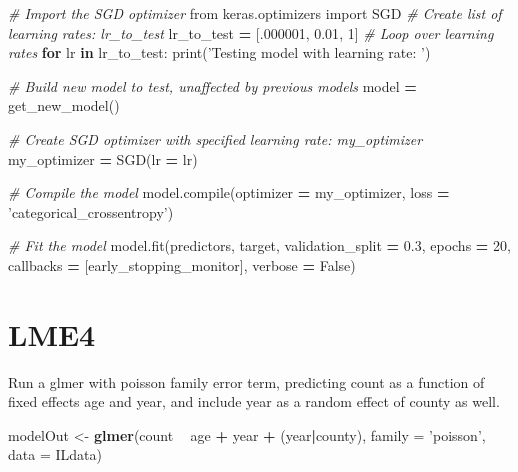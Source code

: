 \documentclass[]{book}
\newenvironment{Shaded}{\begin{snugshade}}{\end{snugshade}}
\newcommand{\KeywordTok}[1]{\textcolor[rgb]{0.13,0.29,0.53}{\textbf{#1}}}
\newcommand{\DataTypeTok}[1]{\textcolor[rgb]{0.13,0.29,0.53}{#1}}
\newcommand{\DecValTok}[1]{\textcolor[rgb]{0.00,0.00,0.81}{#1}}
\newcommand{\FloatTok}[1]{\textcolor[rgb]{0.00,0.00,0.81}{#1}}
\newcommand{\StringTok}[1]{\textcolor[rgb]{0.31,0.60,0.02}{#1}}
\newcommand{\ImportTok}[1]{#1}
\newcommand{\CommentTok}[1]{\textcolor[rgb]{0.56,0.35,0.01}{\textit{#1}}}
\newcommand{\VariableTok}[1]{\textcolor[rgb]{0.00,0.00,0.00}{#1}}
\newcommand{\ControlFlowTok}[1]{\textcolor[rgb]{0.13,0.29,0.53}{\textbf{#1}}}
\newcommand{\OperatorTok}[1]{\textcolor[rgb]{0.81,0.36,0.00}{\textbf{#1}}}
\newcommand{\BuiltInTok}[1]{#1}
\newcommand{\NormalTok}[1]{#1}
\theoremstyle{definition}
\theoremstyle{definition}
\theoremstyle{definition}
\theoremstyle{remark}
\begin{document}
\begin{Shaded}
\begin{Highlighting}[]
\CommentTok{# Import the SGD optimizer}
\ImportTok{from}\NormalTok{ keras.optimizers }\ImportTok{import}\NormalTok{ SGD}
\CommentTok{# Create list of learning rates: lr_to_test}
\NormalTok{lr_to_test }\OperatorTok{=}\NormalTok{ [.}\DecValTok{000001}\NormalTok{, }\FloatTok{0.01}\NormalTok{, }\DecValTok{1}\NormalTok{]}
\CommentTok{# Loop over learning rates}
\ControlFlowTok{for}\NormalTok{ lr }\KeywordTok{in}\NormalTok{ lr_to_test:}
    \BuiltInTok{print}\NormalTok{(}\StringTok{'Testing model with learning rate: '}\NormalTok{)}
    
    \CommentTok{# Build new model to test, unaffected by previous models}
\NormalTok{    model }\OperatorTok{=}\NormalTok{ get_new_model()}
    
    \CommentTok{# Create SGD optimizer with specified learning rate: my_optimizer}
\NormalTok{    my_optimizer }\OperatorTok{=}\NormalTok{ SGD(lr }\OperatorTok{=}\NormalTok{ lr)}
    
    \CommentTok{# Compile the model}
\NormalTok{    model.}\BuiltInTok{compile}\NormalTok{(optimizer }\OperatorTok{=}\NormalTok{ my_optimizer, loss }\OperatorTok{=} \StringTok{'categorical_crossentropy'}\NormalTok{)}
    
    \CommentTok{# Fit the model}
\NormalTok{    model.fit(predictors, }
\NormalTok{              target, }
\NormalTok{              validation_split }\OperatorTok{=} \FloatTok{0.3}\NormalTok{, }
\NormalTok{              epochs }\OperatorTok{=} \DecValTok{20}\NormalTok{, }
\NormalTok{              callbacks }\OperatorTok{=}\NormalTok{ [early_stopping_monitor], }
\NormalTok{              verbose }\OperatorTok{=} \VariableTok{False}\NormalTok{)}
\end{Highlighting}
\end{Shaded}

\section{LME4}\label{lme4}

Run a glmer with poisson family error term, predicting count as a
function of fixed effects age and year, and include year as a random
effect of county as well.

\begin{Shaded}
\begin{Highlighting}[]
\NormalTok{modelOut <-}\StringTok{ }\KeywordTok{glmer}\NormalTok{(count }\OperatorTok{~}\StringTok{ }\NormalTok{age }\OperatorTok{+}\StringTok{ }\NormalTok{year }\OperatorTok{+}\StringTok{ }\NormalTok{(year}\OperatorTok{|}\NormalTok{county), }\DataTypeTok{family =} \StringTok{'poisson'}\NormalTok{,}
                  \DataTypeTok{data =}\NormalTok{ ILdata)}
\end{Highlighting}
\end{Shaded}
\end{document}
